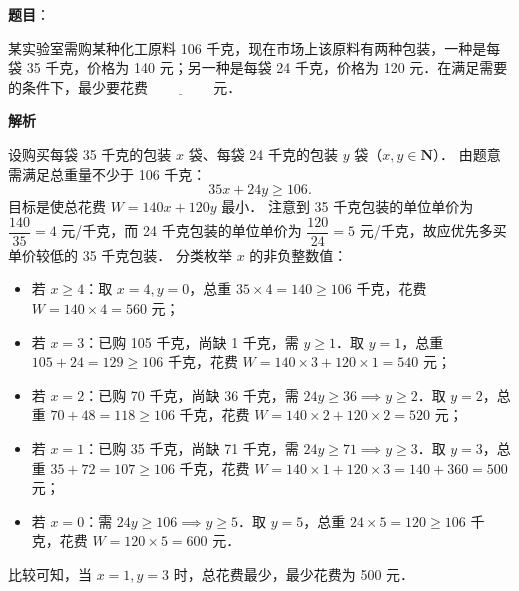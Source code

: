 \begin{answer}

\textbf{题目}：

某实验室需购某种化工原料 106 千克，现在市场上该原料有两种包装，一种是每袋 35 千克，价格为 140 元；另一种是每袋 24 千克，价格为 120 元．在满足需要的条件下，最少要花费 $\underline{\qquad\qquad}$ 元．

\textbf{解析}

设购买每袋 35 千克的包装 $x$ 袋、每袋 24 千克的包装 $y$ 袋（$x, y \in \mathbf{N}$）．
由题意需满足总重量不少于 106 千克：
\nopagebreak[4]
\[
35x + 24y \geqslant 106.
\]
目标是使总花费 $W = 140x + 120y$ 最小．
注意到 35 千克包装的单位单价为 $\dfrac{140}{35} = 4$ 元/千克，而 24 千克包装的单位单价为 $\dfrac{120}{24} = 5$ 元/千克，故应优先多买单价较低的 35 千克包装．
分类枚举 $x$ 的非负整数值：
\begin{itemize}
\item 若 $x \geqslant 4$：取 $x = 4, y = 0$，总重 $35 \times 4 = 140 \geqslant 106$ 千克，花费 $W = 140 \times 4 = 560$ 元；
\item 若 $x = 3$：已购 105 千克，尚缺 1 千克，需 $y \geqslant 1$．取 $y = 1$，总重 $105 + 24 = 129 \geqslant 106$ 千克，花费 $W = 140 \times 3 + 120 \times 1 = 540$ 元；
\item 若 $x = 2$：已购 70 千克，尚缺 36 千克，需 $24y \geqslant 36 \implies y \geqslant 2$．取 $y = 2$，总重 $70 + 48 = 118 \geqslant 106$ 千克，花费 $W = 140 \times 2 + 120 \times 2 = 520$ 元；
\item 若 $x = 1$：已购 35 千克，尚缺 71 千克，需 $24y \geqslant 71 \implies y \geqslant 3$．取 $y = 3$，总重 $35 + 72 = 107 \geqslant 106$ 千克，花费 $W = 140 \times 1 + 120 \times 3 = 140 + 360 = 500$ 元；
\item 若 $x = 0$：需 $24y \geqslant 106 \implies y \geqslant 5$．取 $y = 5$，总重 $24 \times 5 = 120 \geqslant 106$ 千克，花费 $W = 120 \times 5 = 600$ 元．
\end{itemize}

比较可知，当 $x = 1, y = 3$ 时，总花费最少，最少花费为 500 元．


\end{answer}
